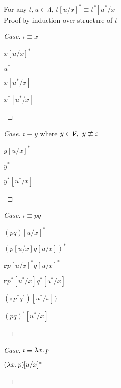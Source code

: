 \begin{prop}
  For any $t, u\in\Lambda$, $t[u/x]^* \equiv t^*[u^*/x]$\\
  Proof by induction over structure of $t$
  \begin{proof}[Case]
    $t\equiv x$
    \begin{itemize}
      \step $x[u/x]^*$

      \step[\equiv] $u^*$

      \step[\equiv] $x[u^*/x]$

      \step[\equiv] $x^*[u^*/x]$
        \marginnote{\Def-$(-)^*$}
        \qedhere
    \end{itemize}
  \end{proof}

  \begin{proof}[Case]
    $t\equiv y$ where $y\in\mathcal{V},~y\not\equiv x$
    \begin{itemize}
      \step $y[u/x]^*$

      \step[\equiv] $y^*$

      \step[\equiv] $y^*[u^*/x]$
        \qedhere
    \end{itemize}
  \end{proof}

  \begin{proof}[Case]
    $t\equiv pq$
    \begin{itemize}
      \step $(pq)[u/x]^*$

      \step[\equiv] $(p[u/x]q[u/x])^*$

      \step[\equiv] $\mathbf{r}p[u/x]^*q[u/x]^*$
          \marginnote{\Def-$(-)^*$}

      \step[\equiv] $\mathbf{r}p^*[u^*/x]q^*[u^*/x]$

      \step[\equiv] $(\mathbf{r}p^*q^*)[u^*/x])$

      \step[\equiv] $(pq)^*[u^*/x]$
          \marginnote{\Def-$(-)^*$}
          \qedhere
    \end{itemize}
  \end{proof}

  \begin{proof}[Case]
    $t\equiv\lambda x\ldotp p$
    \begin{itemize}
      \step
        $(\lambda x\ldotp p)[u/x]^*$


\end{itemize}
\end{proof}
\end{prop}
